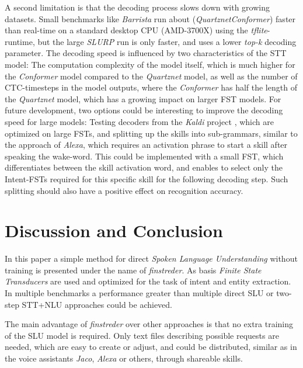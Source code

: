 \documentclass[a4paper]{article}
\begin{document}
A second limitation is that the decoding process slows down with growing datasets. Small benchmarks like \textit{Barrista} run about  (\textit{Quartznet}\textit{Conformer}) faster than real-time on a standard desktop CPU (AMD-3700X) using the \textit{tflite}-runtime, but the large \textit{SLURP} run is only  faster, and uses a lower \textit{top-k} decoding parameter. The decoding speed is influenced by two characteristics of the STT model: The computation complexity of the model itself, which is much higher for the \textit{Conformer} model compared to the \textit{Quartznet} model, as well as the number of CTC-timesteps in the model outputs, where the \textit{Conformer} has half the length of the \textit{Quartznet} model, which has a growing impact on larger FST models.
For future development, two options could be interesting to improve the decoding speed for large models: Testing decoders from the \textit{Kaldi} project \cite{KALDI}, which are optimized on large FSTs, and splitting up the skills into sub-grammars, similar to the approach of \textit{Alexa}, which requires an activation phrase to start a skill after speaking the wake-word. This could be implemented with a small FST, which differentiates between the skill activation word, and enables to select only the Intent-FSTs required for this specific skill for the following decoding step. Such splitting should also have a positive effect on recognition accuracy.



\section{Discussion and Conclusion}
\label{sec:conclu}

In this paper a simple method for direct \textit{Spoken Language Understanding} without training is presented under the name of \textit{finstreder}. As basis \textit{Finite State Transducers} are used and optimized for the task of intent and entity extraction. In multiple benchmarks a performance greater than multiple direct SLU or two-step STT+NLU approaches could be achieved.

\vspace{9pt}
The main advantage of \textit{finstreder} over other approaches is that no extra training of the SLU model is required. Only text files describing possible requests are needed, which are easy to create or adjust, and could be distributed, similar as in the voice assistants \textit{Jaco}, \textit{Alexa} or others, through shareable skills.
\end{document}
